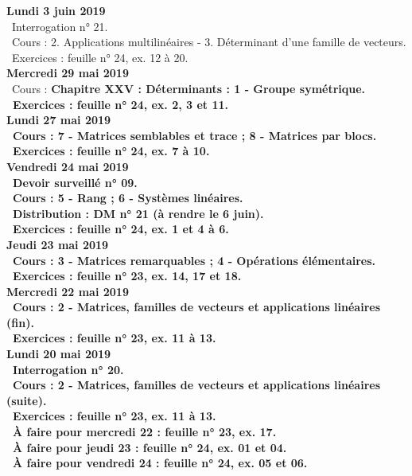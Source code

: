 \documentclass[12pt,a4paper]{article}
\begin{document}
\noindent\textbf{Lundi 3 juin 2019}\\
\bu\ Interrogation n° 21.\\
\bu\ Cours : 2. Applications multilinéaires - 3. Déterminant d’une famille de vecteurs.\\
\bu\ Exercices : feuille n° 24, ex. 12 à 20.\vspace{.4cm}\\

\noindent\textbf{Mercredi 29 mai 2019}\\
\bu\ Cours : \bf Chapitre XXV \rm : Déterminants : 1 - Groupe symétrique.\\
\bu\ Exercices : feuille n° 24, ex. 2, 3 et 11.\vspace{.4cm}\\

\noindent\textbf{Lundi 27 mai 2019}\\
\bu\ Cours : 7 - Matrices semblables et trace ; 8 - Matrices par blocs.\\
\bu\ Exercices : feuille n° 24, ex. 7 à 10.\vspace{.4cm}\\

\noindent\textbf{Vendredi 24 mai 2019}\\
\bu\ Devoir surveillé n° 09.\\
\bu\ Cours : 5 - Rang ; 6 - Systèmes linéaires.\\
\bu\ Distribution : DM n° 21 (à rendre le 6 juin).\\
\bu\ Exercices : feuille n° 24, ex. 1 et 4 à 6.\vspace{.4cm}\\
 
\noindent\textbf{Jeudi 23 mai 2019}\\
\bu\ Cours : 3 - Matrices remarquables ; 4 - Opérations élémentaires.\\
\bu\ Exercices : feuille n° 23, ex. 14, 17 et 18.\vspace{.4cm}\\

\noindent\textbf{Mercredi 22 mai 2019}\\
\bu\ Cours : 2 - Matrices, familles de vecteurs et applications linéaires (fin).\\
\bu\ Exercices : feuille n° 23, ex. 11 à 13.\vspace{.4cm}\\
 
\noindent\textbf{Lundi 20 mai 2019}\\
\bu\ Interrogation n° 20.\\
\bu\ Cours : 2 - Matrices, familles de vecteurs et applications linéaires (suite).\\
\bu\ Exercices : feuille n° 23, ex. 11 à 13.\\
\bu\ À faire pour mercredi 22 : feuille n° 23, ex. 17.\\
\bu\ À faire pour jeudi 23 : feuille n° 24, ex. 01 et 04.\\
\bu\ À faire pour vendredi 24 : feuille n° 24, ex. 05 et 06.\vspace{.4cm}\\
 
\end{document}

